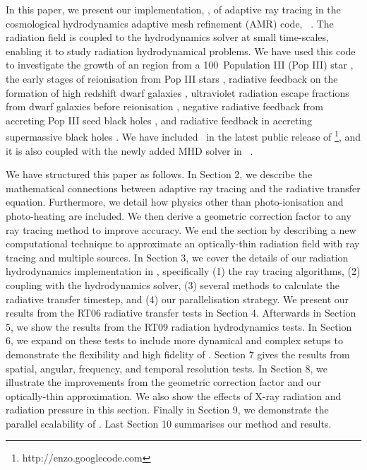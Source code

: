 \documentclass[useAMS,usenatbib]{mn2e}
\begin{document}
In this paper, we present our implementation, \moray, of adaptive ray
tracing \citep{Abel02_RT} in the cosmological hydrodynamics adaptive
mesh refinement (AMR) code, \enzo~\citep{BryanNorman1997, OShea2004}.
The radiation field is coupled to the hydrodynamics solver at small
time-scales, enabling it to study radiation hydrodynamical problems.
We have used this code to investigate the growth of an \hii region
from a 100\Ms~Population III (Pop III) star \citep{Abel07}, the early
stages of reionisation from Pop III stars \citep{Wise08_Reion},
radiative feedback on the formation of high redshift dwarf galaxies
\citep{Wise08_Gal, Wise10_Gal}, ultraviolet radiation escape fractions
from dwarf galaxies before reionisation \citep{Wise09}, negative
radiative feedback from accreting Pop III seed black holes
\citep{Alvarez09}, and radiative feedback in accreting supermassive
black holes \citep[][in prep.]{Kim11}.  We have included \moray~in the
latest public release of \enzo\footnote{http://enzo.googlecode.com},
and it is also coupled with the newly added MHD solver in
\enzo~\citep{Wang09}.

We have structured this paper as follows.  In Section 2, we describe
the mathematical connections between adaptive ray tracing and the
radiative transfer equation.  Furthermore, we detail how physics other
than photo-ionisation and photo-heating are included.  We then derive a
geometric correction factor to any ray tracing method to improve
accuracy.  We end the section by describing a new computational
technique to approximate an optically-thin radiation field with ray
tracing and multiple sources.  In Section 3, we cover the details of
our radiation hydrodynamics implementation in \enzo, specifically (1)
the ray tracing algorithms, (2) coupling with the hydrodynamics
solver, (3) several methods to calculate the radiative transfer
timestep, and (4) our parallelisation strategy.  We present our
results from the RT06 radiative transfer tests in Section 4.
Afterwards in Section 5, we show the results from the RT09 radiation
hydrodynamics tests.  In Section 6, we expand on these tests to
include more dynamical and complex setups to demonstrate the
flexibility and high fidelity of \moray.  Section 7 gives the results
from spatial, angular, frequency, and temporal resolution tests.  In
Section 8, we illustrate the improvements from the geometric
correction factor and our optically-thin approximation.  We also show
the effects of X-ray radiation and radiation pressure in this section.
Finally in Section 9, we demonstrate the parallel scalability of
\moray.  Last Section 10 summarises our method and results.
\end{document}
